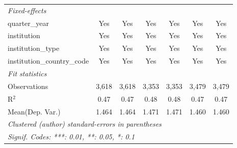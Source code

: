 \begin{tabular}{lcccccc}
   \midrule
   \emph{Fixed-effects}\\
   quarter\_year                      & Yes     & Yes     & Yes     & Yes           & Yes     & Yes\\  
   institution                        & Yes     & Yes     & Yes     & Yes           & Yes     & Yes\\  
   institution\_type                  & Yes     & Yes     & Yes     & Yes           & Yes     & Yes\\  
   institution\_country\_code         & Yes     & Yes     & Yes     & Yes           & Yes     & Yes\\  
   \midrule
   \emph{Fit statistics}\\
   Observations                       & 3,618   & 3,618   & 3,353   & 3,353         & 3,479   & 3,479\\  
   R$^2$                              & 0.47    & 0.47    & 0.48    & 0.48          & 0.47    & 0.47\\  
Mean(Dep. Var.) & 1.464 & 1.464 & 1.471 & 1.471 & 1.460 & 1.460 \\
   \midrule \midrule
   \multicolumn{7}{l}{\emph{Clustered (author) standard-errors in parentheses}}\\
   \multicolumn{7}{l}{\emph{Signif. Codes: ***: 0.01, **: 0.05, *: 0.1}}\\
\end{tabular}
\par\endgroup
